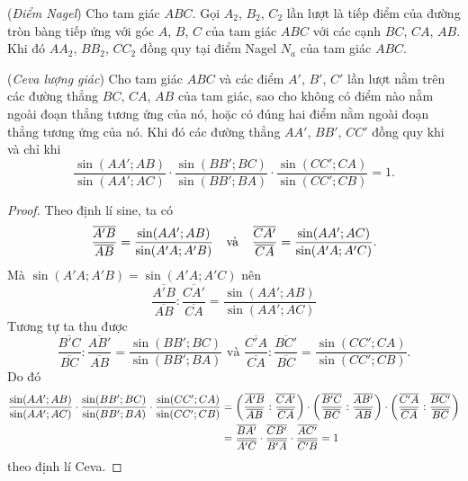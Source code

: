 \documentclass{article} %
\begin{document}
        \begin{corollary}
            (\textit{Điểm Nagel}) Cho tam giác \(ABC\). Gọi \(A_2\), \(B_2\), \(C_2\) lần lượt là tiếp điểm của đường tròn bàng tiếp ứng với góc \(A\), \(B\), \(C\) của tam giác \(ABC\) với các cạnh \(BC\), \(CA\), \(AB\). Khi đó \(AA_2\), \(BB_2\), \(CC_2\) đồng quy tại điểm Nagel \(N_a\) của tam giác \(ABC\). 
        \end{corollary}

        \begin{theorem}
            (\textit{Ceva lượng giác}) Cho tam giác \(ABC\) và các điểm \(A'\), \(B'\), \(C'\) lần lượt nằm trên các đường thẳng \(BC\), \(CA\), \(AB\) của tam giác, sao cho không có điểm nào nằm ngoài đoạn thẳng tương ứng của nó, hoặc có đúng hai điểm nằm ngoài đoạn thẳng tương ứng của nó. Khi đó các đường thẳng \(AA'\), \(BB'\), \(CC'\) đồng quy khi và chỉ khi
            \[\frac{\sin (AA';AB)}{\sin (AA';AC)} \cdot \frac{\sin (BB';BC)}{\sin (BB';BA)} \cdot \frac{\sin (CC';CA)}{\sin (CC';CB)} = 1.\]
        \end{theorem}

        \begin{proof}
            Theo định lí sine, ta có
            \[\frac{\overline{A'B}}{\overline{AB}} = \frac{\sin (AA';AB)}{\sin (A'A;A'B)} \hspace{0.25cm} \text{ và } \hspace{0.25cm} \frac{\overline{CA'}}{\overline{CA}} = \frac{\sin (AA';AC)}{\sin (A'A;A'C)}.\]
            Mà \(\sin (A'A;A'B) = \sin (A'A;A'C)\) nên
            \[\frac{\overline{A'B}}{\overline{AB}} : \frac{\overline{CA'}}{\overline{CA}} = \frac{\sin (AA';AB)}{\sin (AA';AC)}\]
            Tương tự ta thu được
            \[\frac{\overline{B'C}}{\overline{BC}} : \frac{\overline{AB'}}{\overline{AB}} = \frac{\sin (BB';BC)}{\sin (BB';BA)} \text{ và } \frac{\overline{C'A}}{\overline{CA}} : \frac{\overline{BC'}}{\overline{BC}} = \frac{\sin (CC';CA)}{\sin (CC';CB)}.\]
            Do đó
            \begin{equation}
                \begin{aligned}
                    \frac{\sin (AA';AB)}{\sin (AA';AC)} \cdot \frac{\sin (BB';BC)}{\sin (BB';BA)} \cdot \frac{\sin (CC';CA)}{\sin (CC';CB)}
                    & = \left(\frac{\overline{A'B}}{\overline{AB}} : \frac{\overline{CA'}}{\overline{CA}}\right) \cdot \left(\frac{\overline{B'C}}{\overline{BC}} : \frac{\overline{AB'}}{\overline{AB}}\right) \cdot \left(\frac{\overline{C'A}}{\overline{CA}} : \frac{\overline{BC'}}{\overline{BC}}\right) \\
                    & = \frac{\overline{BA'}}{\overline{A'C}} \cdot \frac{\overline{CB'}}{\overline{B'A}} \cdot \frac{\overline{AC'}}{\overline{C'B}} = 1
                \end{aligned}
                \notag
            \end{equation}
            theo định lí Ceva.
        \end{proof}
\end{document}
